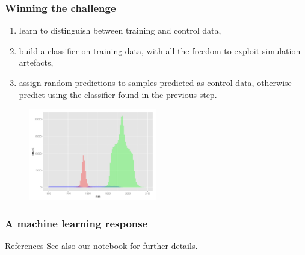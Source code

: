 \documentclass{beamer}
\begin{document}
\begin{frame}
  \frametitle{Winning the challenge}

%

\begin{enumerate}
\item learn to distinguish between training and control data,
\item build a classifier on training data, with all the freedom to exploit simulation artefacts,
\item assign random predictions to samples predicted as control data, otherwise predict using the classifier found in the previous step.
\end{enumerate}

\begin{figure}
\centering
\includegraphics[width=0.5\textwidth]{hole.png}
\end{figure}

\end{frame}

\begin{frame}
  \frametitle{A machine learning response}



\end{frame}

\begin{frame}[t]{References}
    See also our \href{https://github.com/glouppe/notebooks/blob/master/Classification\%20with\%20a\%20control\%20channel.ipynb}{notebook} for further details.
\end{frame}
\end{document}
